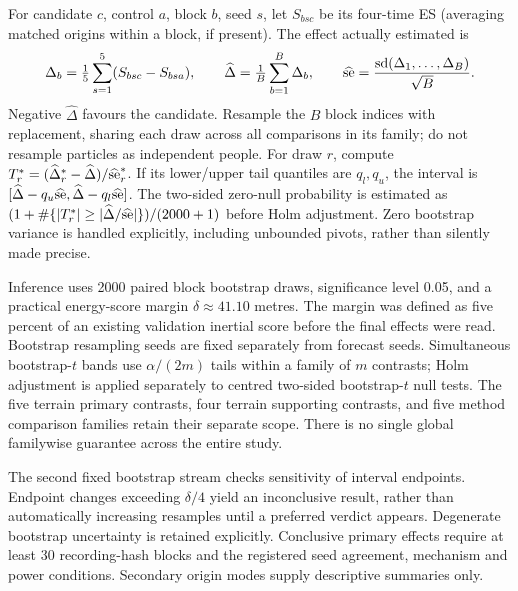 \documentclass[11pt]{article}
\begin{document}
For candidate \(c\), control \(a\), block \(b\), seed \(s\), let
\(S_{bsc}\) be its four-time ES (averaging matched origins within a block,
if present). The effect actually estimated is
\begin{equation}
 \Delta_b=\tfrac15\sum_{s=1}^5(S_{bsc}-S_{bsa}),\qquad
 \widehat\Delta=\tfrac1{B}\sum_{b=1}^{B}\Delta_b,\qquad
 \widehat{\rm se}=\frac{{\rm sd}(\Delta_1,\ldots,\Delta_B)}{\sqrt B}.
 \label{eq:paired-estimand}
\end{equation}
Negative \(\widehat\Delta\) favours the candidate. Resample the \(B\) block
indices with replacement, sharing each draw across all comparisons in its
family; do not resample particles as independent people.
For draw \(r\), compute \(T_r^*=(\widehat\Delta_r^*-\widehat\Delta)/
\widehat{\rm se}_r^*\). If its lower/upper tail quantiles are \(q_l,q_u\),
the interval is
\([\widehat\Delta-q_u\widehat{\rm se},\widehat\Delta-q_l\widehat{\rm se}]\).
The two-sided zero-null probability is estimated as
\((1+\#\{|T_r^*|\geq|\widehat\Delta/\widehat{\rm se}|\})/(2000+1)\)
before Holm adjustment. Zero bootstrap variance is handled explicitly,
including unbounded pivots, rather than silently made precise.

Inference uses 2000 paired block bootstrap draws, significance level 0.05,
and a practical energy-score margin \(\delta\approx41.10\) metres. The margin
was defined as five percent of an existing validation inertial score before
the final effects were read. Bootstrap resampling seeds are fixed separately
from forecast seeds. Simultaneous bootstrap-\(t\) bands use
\(\alpha/(2m)\) tails within a family of \(m\) contrasts; Holm adjustment
is applied separately to centred two-sided bootstrap-\(t\) null tests.
The five terrain primary contrasts, four terrain supporting contrasts, and
five method comparison families retain their separate scope. There is no
single global familywise guarantee across the entire study.

The second fixed bootstrap stream checks sensitivity of interval endpoints.
Endpoint changes exceeding \(\delta/4\) yield an inconclusive result, rather
than automatically increasing resamples until a preferred verdict appears.
Degenerate bootstrap uncertainty is retained explicitly. Conclusive primary
effects require at least 30 recording-hash blocks and the registered seed
agreement, mechanism and power conditions. Secondary origin modes supply
descriptive summaries only.
\end{document}
